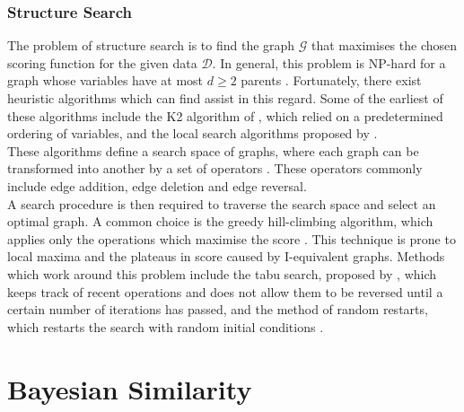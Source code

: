 \documentclass [11pt]{article}
\begin{document}
\subsubsection{Structure Search}
The problem of structure search is to find the graph $\mathcal{G}$ that maximises the chosen scoring function for the given data $\mathcal{D}$. In general, this problem is NP-hard for a graph whose variables have at most $d\geq 2$ parents \citep{chickering96}. Fortunately, there exist heuristic algorithms which can find assist in this regard. Some of the earliest of these algorithms include the K2 algorithm of \citet{cooper92}, which relied on a predetermined ordering of variables, and the local search algorithms proposed by \citet{heckerman95}.
\\
These algorithms define a search space of graphs, where each graph can be transformed into another by a set of operators \citep{koller09}. These operators commonly include edge addition, edge deletion and edge reversal. 
\\
A search procedure is then required to traverse the search space and select an optimal graph. A common choice is the greedy hill-climbing algorithm, which applies only the operations which maximise the score \citep{koller09}. This technique is prone to local maxima and the plateaus in score caused by I-equivalent graphs. Methods which work around this problem include the tabu search, proposed by \citet{glover86}, which keeps track of recent operations and does not allow them to be reversed until a certain number of iterations has passed, and the method of random restarts, which restarts the search with random initial conditions \citep{koller09}.
\section{Bayesian Similarity}\label{BayesianSimilarity}


\end{document}
